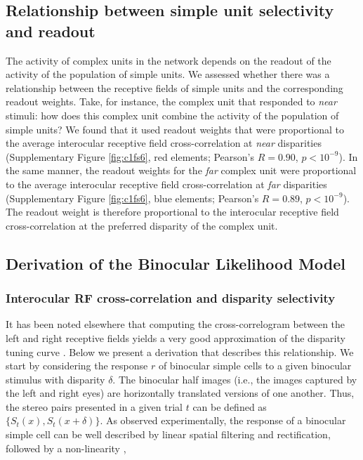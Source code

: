 \subsection*{Relationship between simple unit selectivity and readout}

The activity of complex units in the network depends on the readout of the activity of the population of simple units. We assessed whether there was a relationship between the receptive fields of simple units and the corresponding readout weights. Take, for instance, the complex unit that responded to \textit{near} stimuli: how does this complex unit combine the activity of the population of simple units? We found that it used readout weights that were proportional to the average interocular receptive field cross-correlation at \textit{near} disparities (Supplementary Figure \ref{fig:c1fs6}, red elements; Pearson's $R=0.90$, $p<10^{-9}$). In the same manner, the readout weights for the \textit{far} complex unit were proportional to the average interocular receptive field cross-correlation at \textit{far} disparities (Supplementary Figure \ref{fig:c1fs6}, blue elements; Pearson's $R=0.89$, $p<10^{-9}$). The readout weight is therefore proportional to the interocular receptive field cross-correlation at the preferred disparity of the complex unit.

\subsection*{Derivation of the Binocular Likelihood Model}
\subsubsection*{Interocular RF cross-correlation and disparity selectivity}

It has been noted elsewhere that computing the cross-correlogram between the left and right receptive fields yields a very good approximation of the disparity tuning curve \cite{Ferster:1981kl,Tsao:2003pi,Read:2003ij}. Below we present a derivation that describes this relationship. We start by considering the response $r$ of binocular simple cells to a given binocular stimulus with disparity $\delta$. The binocular half images (i.e., the images captured by the left and right eyes) are horizontally translated versions of one another. Thus, the stereo pairs presented in a given trial $t$ can be defined as $\{S_t(x), S_t(x+\delta)\}$. As observed experimentally, the response of a binocular simple cell can be well described by linear spatial filtering and rectification, followed by a non-linearity \cite{Ohzawa:1990cq,Anzai:1999uq},

